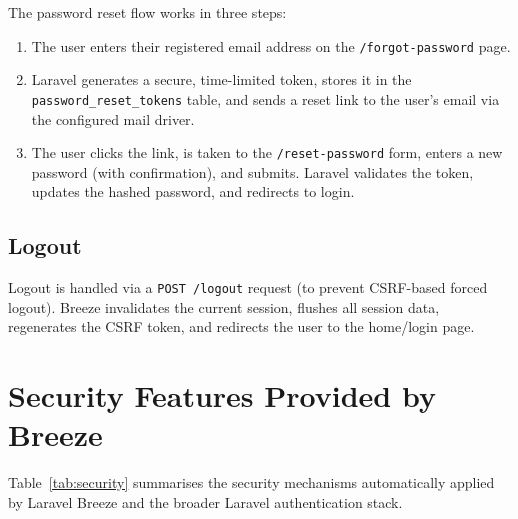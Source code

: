 \documentclass[12pt,a4paper]{report}
\begin{document}
\begin{titlepage}
The password reset flow works in three steps:
\begin{enumerate}[leftmargin=1.5cm]
    \item The user enters their registered email address on the
    \texttt{/forgot-password} page.
    \item Laravel generates a secure, time-limited token, stores it in the
    \texttt{password\_reset\_tokens} table, and sends a reset link to the
    user's email via the configured mail driver.
    \item The user clicks the link, is taken to the \texttt{/reset-password}
    form, enters a new password (with confirmation), and submits. Laravel
    validates the token, updates the hashed password, and redirects to login.
\end{enumerate}

\subsection{Logout}

Logout is handled via a \texttt{POST /logout} request (to prevent CSRF-based
forced logout). Breeze invalidates the current session, flushes all session data,
regenerates the CSRF token, and redirects the user to the home/login page.

\section{Security Features Provided by Breeze}

Table~\ref{tab:security} summarises the security mechanisms automatically applied
by Laravel Breeze and the broader Laravel authentication stack.


\end{titlepage}
\end{document}
